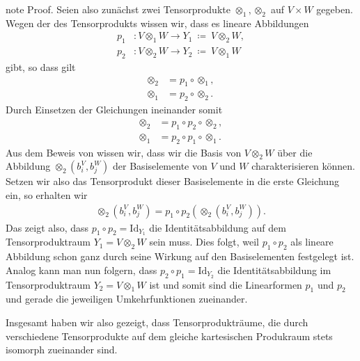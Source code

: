 \documentclass[letterpaper,10pt,english]{jupyterBook}
\begin{document}
\begin{sphinxadmonition}{note}
\sphinxAtStartPar
Proof. Seien also zunächst zwei Tensorprodukte \(\otimes_1, \otimes_2\) auf \(V\times W\) gegeben.
Wegen der  des Tensorprodukts wissen wir, dass es lineare Abbildungen
\begin{equation*}
\begin{split}p_1&: V\otimes_1 W\to Y_1 \ \coloneqq \ V\otimes_2 W,\\
p_2&: V\otimes_2 W\to Y_2 \ \coloneqq \ V\otimes_1 W\end{split}
\end{equation*}
\sphinxAtStartPar
gibt, so dass gilt
\begin{equation*}
\begin{split}\otimes_2 &= p_1 \circ \otimes_1,\\
\otimes_1 &= p_2 \circ \otimes_2.\end{split}
\end{equation*}
\sphinxAtStartPar
Durch Einsetzen der Gleichungen ineinander somit
\begin{equation*}
\begin{split}\otimes_2 &= p_1\circ p_2 \circ \otimes_2,\\
\otimes_1 &= p_2\circ p_1 \circ \otimes_1.\end{split}
\end{equation*}
\sphinxAtStartPar
Aus dem Beweis von {\hyperref[\detokenize{vektoranalysis/tensor:thm:existenzTensorprodukt}]{}} wissen wir, dass wir die Basis von \(V\otimes_2 W\) über die Abbildung \(\otimes_2(b_i^V, b_j^W)\) der Basiselemente von \(V\) und \(W\) charakterisieren können.
Setzen wir also das Tensorprodukt dieser Basiselemente in die erste Gleichung ein, so erhalten wir
\begin{equation*}
\begin{split}\otimes_2(b_i^V, b_j^W) = p_1\circ p_2(\otimes_2(b_i^V,b_j^W)).\end{split}
\end{equation*}
\sphinxAtStartPar
Das zeigt also, dass \(p_1\circ p_2 = \mathrm{Id}_{Y_1}\) die Identitätsabbildung auf dem Tensorproduktraum \(Y_1 = V \otimes_2 W\) sein muss.
Dies folgt, weil \(p_1\circ p_2\) als lineare Abbildung schon ganz durch seine Wirkung auf den Basiselementen festgelegt ist.
Analog kann man nun folgern, dass \(p_2\circ p_1 = \mathrm{Id}_{Y_2}\) die Identitätsabbildung im Tensorproduktraum \(Y_2 = V \otimes_1 W\) ist und somit sind die Linearformen \(p_1\) und \(p_2\)  und gerade die jeweiligen Umkehrfunktionen zueinander.

\sphinxAtStartPar
Insgesamt haben wir also gezeigt, dass Tensorprodukträume, die durch verschiedene Tensorprodukte auf dem gleiche kartesischen Produkraum stets isomorph zueinander sind.
\end{sphinxadmonition}
\end{document}
